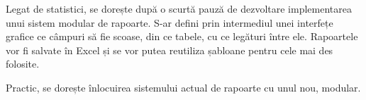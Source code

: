 		Legat de statistici, se dorește după o scurtă pauză de dezvoltare implementarea unui sistem modular de rapoarte.
		S-ar defini prin intermediul unei interfețe grafice ce câmpuri să fie scoase, din ce tabele, cu ce legături între ele.
		Rapoartele vor fi salvate în Excel și se vor putea reutiliza șabloane pentru cele mai des folosite.

		Practic, se dorește înlocuirea sistemului actual de rapoarte cu unul nou, modular.

